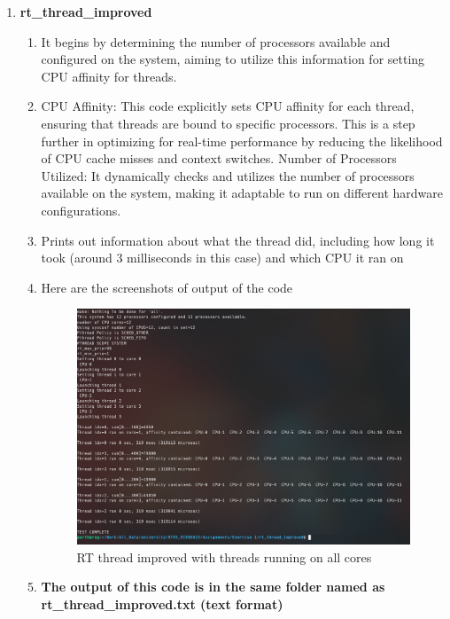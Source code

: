 \documentclass[a4paper,11pt]{article}%
\newenvironment{qanda}{\setlength{\parindent}{0pt}}{\bigskip}
\begin{document}
\begin{qanda}
\begin{enumerate}
\begin{enumerate}
\begin{enumerate}
\begin{enumerate}
					\end{enumerate}
					\item \textbf{rt\_thread\_improved}
					\begin{enumerate}
						\item It begins by determining the number of processors available and configured on the system, aiming to utilize this information for setting CPU affinity for threads.
						\item CPU Affinity: This code explicitly sets CPU affinity for each thread, ensuring that threads are bound to specific processors. This is a step further in optimizing for real-time performance by reducing the likelihood of CPU cache misses and context switches.
						Number of Processors Utilized: It dynamically checks and utilizes the number of processors available on the system, making it adaptable to run on different hardware configurations.
						\item Prints out information about what the thread did, including how long it took (around 3 milliseconds in this case) and which CPU it ran on
						\item Here are the screenshots of output of the code 
						\begin{figure}[H]
							\centering
							\includegraphics[scale=0.4]{figures/rt_thread_improved.png}
							\caption{RT thread improved with threads running on all cores}
							\label{rm}
						\end{figure}
						

						\item \textbf{The output of this code is in the same folder named as rt\_thread\_improved.txt (text format) }
						

\end{enumerate}
\end{enumerate}
\end{enumerate}
\end{enumerate}
\end{qanda}
\end{document}
